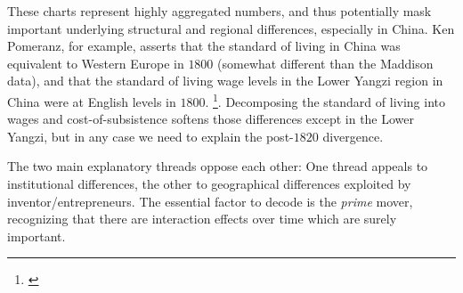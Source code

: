 \documentclass[12pt]{article}
\numberwithin{equation}{section}
\begin{document}

		
		These charts represent highly aggregated numbers, and thus potentially mask important underlying structural and regional differences, especially in China. Ken Pomeranz, for example, asserts that the standard of living in China was equivalent to Western Europe in $1800$ (somewhat different than the Maddison data), and that the standard of living wage levels in the Lower Yangzi region in China were at English levels in $1800$. \footnote{\citet[p.~107]{pomeranz_great_2001}}. Decomposing the standard of living into wages and cost-of-subsistence softens those differences except in the Lower Yangzi, but in any case we need to explain the post-$1820$ divergence.
		
		The two main explanatory threads oppose each other: One thread appeals to institutional differences, the other to geographical differences exploited by inventor/entrepreneurs. The essential factor to decode is the \textit{prime} mover, recognizing that there are interaction effects over time which are surely important.
		
\end{document}
